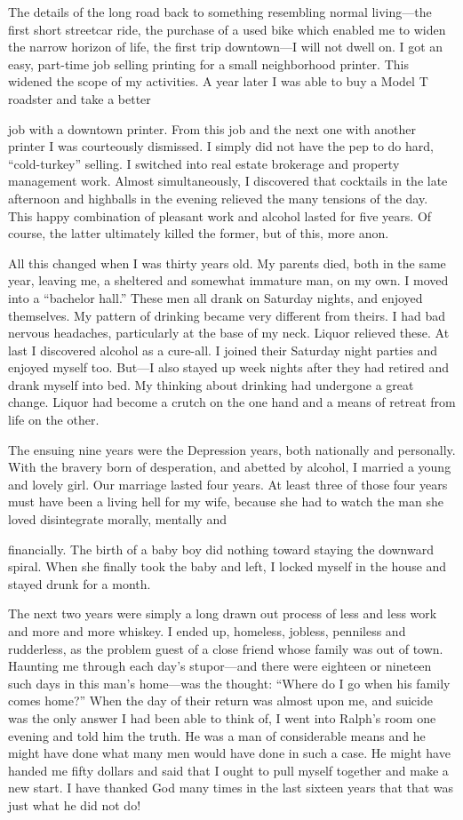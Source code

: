 The details of the long road back to something resembling normal living—the first short streetcar ride, the purchase of a used bike which enabled me to widen the narrow horizon of life, the first trip downtown—I will not dwell on. I got an easy, part-time job selling printing for a small neighborhood printer. This widened the scope of my activities. A year later I was able to buy a Model T roadster and take a better

job with a downtown printer. From this job and the next one with another printer I was courteously dismissed. I simply did not have the pep to do hard, “cold-turkey” selling. I switched into real estate brokerage and property management work. Almost simultaneously, I discovered that cocktails in the late afternoon and highballs in the evening relieved the many tensions of the day. This happy combination of pleasant work and alcohol lasted for five years. Of course, the latter ultimately killed the former, but of this, more anon.

All this changed when I was thirty years old. My parents died, both in the same year, leaving me, a sheltered and somewhat immature man, on my own. I moved into a “bachelor hall.” These men all drank on Saturday nights, and enjoyed themselves. My pattern of drinking became very different from theirs. I had bad nervous headaches, particularly at the base of my neck. Liquor relieved these. At last I discovered alcohol as a cure-all. I joined their Saturday night parties and enjoyed myself too. But—I also stayed up week nights after they had retired and drank myself into bed. My thinking about drinking had undergone a great change. Liquor had become a crutch on the one hand and a means of retreat from life on the other.

The ensuing nine years were the Depression years, both nationally and personally. With the bravery born of desperation, and abetted by alcohol, I married a young and lovely girl. Our marriage lasted four years. At least three of those four years must have been a living hell for my wife, because she had to watch the man she loved disintegrate morally, mentally and

financially. The birth of a baby boy did nothing toward staying the downward spiral. When she finally took the baby and left, I locked myself in the house and stayed drunk for a month.

The next two years were simply a long drawn out process of less and less work and more and more whiskey. I ended up, homeless, jobless, penniless and rudderless, as the problem guest of a close friend whose family was out of town. Haunting me through each day’s stupor—and there were eighteen or nineteen such days in this man’s home—was the thought: “Where do I go when his family comes home?” When the day of their return was almost upon me, and suicide was the only answer I had been able to think of, I went into Ralph’s room one evening and told him the truth. He was a man of considerable means and he might have done what many men would have done in such a case. He might have handed me fifty dollars and said that I ought to pull myself together and make a new start. I have thanked God many times in the last sixteen years that that was just what he did not do!

